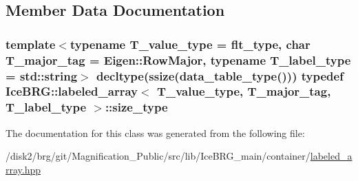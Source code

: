 \subsection{Member Data Documentation}
\hypertarget{classIceBRG_1_1labeled__array_a9c667890832a65f117cd2806686ff3ef}{}
\subsubsection[{size\+\_\+type}]{\setlength{\rightskip}{0pt plus 5cm}template$<$typename T\+\_\+value\+\_\+type = flt\+\_\+type, char T\+\_\+major\+\_\+tag = Eigen\+::\+Row\+Major, typename T\+\_\+label\+\_\+type = std\+::string$>$ decltype({\bf ssize}({\bf data\+\_\+table\+\_\+type}())) typedef {\bf Ice\+B\+R\+G\+::labeled\+\_\+array}$<$ T\+\_\+value\+\_\+type, T\+\_\+major\+\_\+tag, T\+\_\+label\+\_\+type $>$\+::{\bf size\+\_\+type}}\label{classIceBRG_1_1labeled__array_a9c667890832a65f117cd2806686ff3ef}


The documentation for this class was generated from the following file\+:\begin{DoxyCompactItemize}
\item 
/disk2/brg/git/\+Magnification\+\_\+\+Public/src/lib/\+Ice\+B\+R\+G\+\_\+main/container/\hyperlink{labeled__array_8hpp}{labeled\+\_\+array.\+hpp}\end{DoxyCompactItemize}
